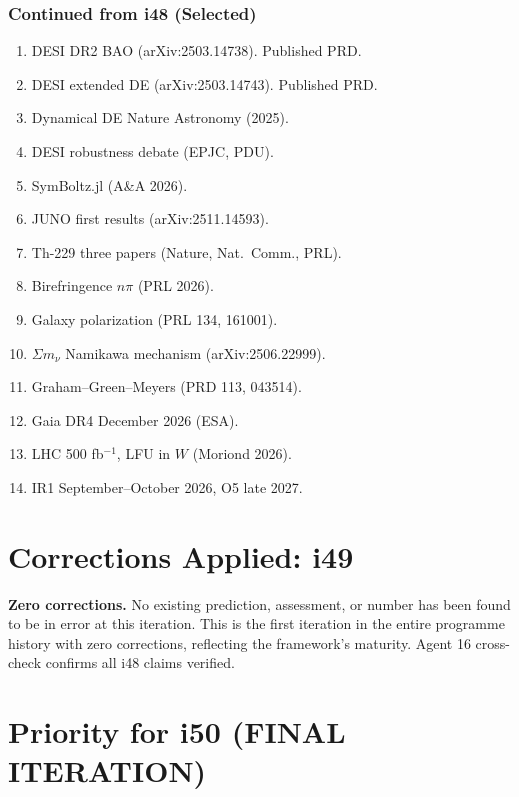 \documentclass[11pt,a4paper]{article}
\begin{document}
\section{Continued from i48 (Selected)}

\begin{enumerate}
\item DESI DR2 BAO (arXiv:2503.14738). Published PRD.
\item DESI extended DE (arXiv:2503.14743). Published PRD.
\item Dynamical DE Nature Astronomy (2025).
\item DESI robustness debate (EPJC, PDU).
\item SymBoltz.jl (A\&A 2026).
\item JUNO first results (arXiv:2511.14593).
\item Th-229 three papers (Nature, Nat.\ Comm., PRL).
\item Birefringence $n\pi$ (PRL 2026).
\item Galaxy polarization (PRL 134, 161001).
\item $\Sigma m_\nu$ Namikawa mechanism (arXiv:2506.22999).
\item Graham--Green--Meyers (PRD 113, 043514).
\item Gaia DR4 December 2026 (ESA).
\item LHC 500 fb$^{-1}$, LFU in $W$ (Moriond 2026).
\item IR1 September--October 2026, O5 late 2027.
\end{enumerate}


\part{Corrections Applied: i49}

\textbf{Zero corrections.} No existing prediction, assessment, or number has been found to be in error at this iteration. This is the first iteration in the entire programme history with zero corrections, reflecting the framework's maturity. Agent 16 cross-check confirms all i48 claims verified.


\part{Priority for i50 (FINAL ITERATION)}
\end{document}
